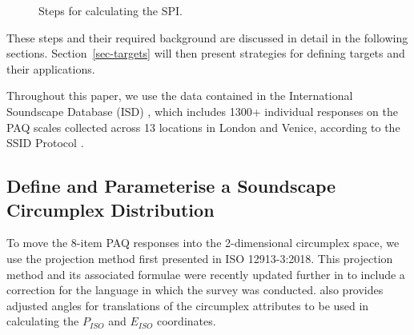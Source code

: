 \documentclass[
  authoryear,
  preprint,
  3p]{elsarticle}
\begin{document}
\begin{figure}


\caption{\label{fig-bespoke-spi}Steps for calculating the SPI.}

\end{figure}%

These steps and their required background are discussed in detail in the
following sections. Section~\ref{sec-targets} will then present
strategies for defining targets and their applications.

Throughout this paper, we use the data contained in the International
Soundscape Database (ISD) \citep{Mitchell2024International}, which
includes 1300+ individual responses on the PAQ scales collected across
13 locations in London and Venice, according to the SSID Protocol
\citet{Mitchell2020Soundscape}.

\subsection{Define and Parameterise a Soundscape Circumplex
Distribution}\label{sec-circumplex-distribution}

To move the 8-item PAQ responses into the 2-dimensional circumplex
space, we use the projection method first presented in ISO 12913-3:2018.
This projection method and its associated formulae were recently updated
further in \citet{Mitchell2023Testing} to include a correction for the
language in which the survey was conducted. \citet{Mitchell2023Testing}
also provides adjusted angles for translations of the circumplex
attributes to be used in calculating the \(P_{ISO}\) and \(E_{ISO}\)
coordinates.
\end{document}
